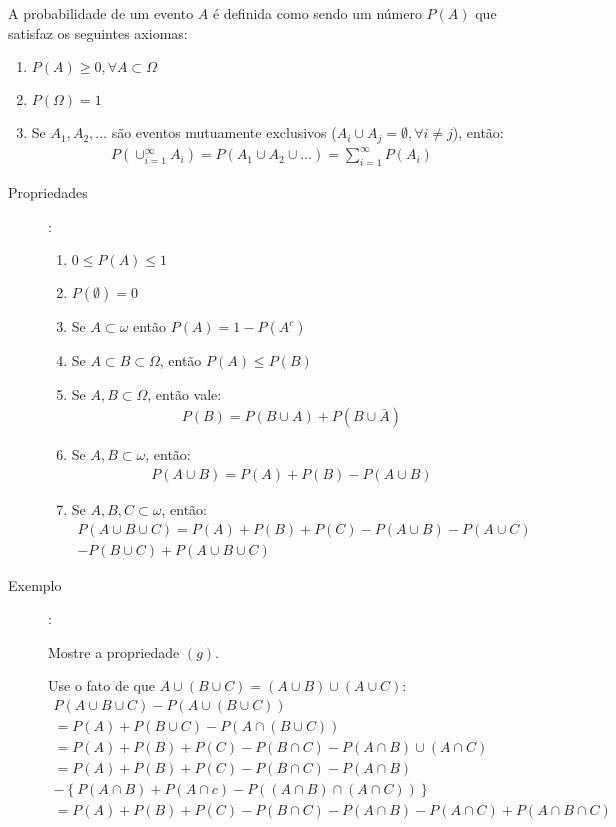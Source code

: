 \documentclass[11pt,a4paper]{book}
\begin{document}
A probabilidade de um evento $A$ é definida como sendo um número $P(A)$ que satisfaz
os seguintes axiomas:
\begin{enumerate}[leftmargin=*, label=\Roman*., widest=IV, align=left]
  \item $P(A) \ge 0, \forall A \subset \Omega$
  \item $P(\Omega)=1$
  \item Se $A_1, A_2,\ldots$ são eventos mutuamente exclusivos ($A_i \cup A_j = \emptyset, \forall i \neq j$), então:
    \begin{align}
      P(\cup^\infty_{i=1} A_i)= P(A_1\cup A_2 \cup \ldots)= \sum^\infty_{i=1} P(A_i) 
    \end{align}
\end{enumerate}
\begin{description}
\item[Propriedades]:

\begin{enumerate}[label=(\alph*)]
  \item $0 \le P(A) \le 1$
  \item $P(\emptyset)=0$
  \item Se $A \subset \omega$ então $P(A)=1-P(A^c)$
  \item Se $A \subset B \subset \Omega$, então $P(A) \le P(B)$
  \item Se $A,B \subset \Omega$, então vale:
    \begin{align}
      P(B)= P(B\cup A)+ P(B\cup \bar{A})
    \end{align}
  \item Se $A,B \subset \omega$, então:
    \begin{align}
      P(A\cup B)= P(A)+P(B)-P(A\cup B)
    \end{align}
  \item Se $A,B,C \subset \omega$, então:
    \begin{align}
      P(A\cup B \cup C)= P(A)+P(B)+P(C)-P(A \cup B)- P(A \cup C) \nonumber\\-
      P(B\cup C)+P(A\cup B \cup C) 
    \end{align}
\end{enumerate}
\item [Exemplo]: 

Mostre a propriedade $(g)$.

Use o fato de que $A\cup (B \cup C )= (A\cup B )\cup (A \cup C )$:
\begin{align*}
  P\left(A\cup B\cup C \right)- P\left(A \cup \left(B \cup C\right) \right)\\
  =P(A)+P(B\cup C)- P\left(A\cap \left(B\cup C \right) \right)\\
  =P(A)+P(B)+P(C)-P(B\cap C)- P(A \cap B)\cup (A \cap C)\\
  =P(A)+P(B)+P(C)-P(B\cap C)- P(A \cap B) \\ -\left\{ P \left(A \cap B \right)+ P\left(A \cap c \right)-P\left(\left(A \cap B \right) \cap \left(A \cap C \right) \right) \right\} \\
  =P(A)+P(B)+P(C)-P(B\cap C)- P(A \cap B)- P(A \cap C)+ P(A \cap B \cap C)
\end{align*}


\end{description}
\end{document}
